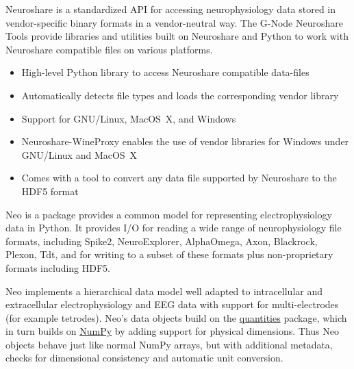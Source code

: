 \begin{multicols}{3}

Neuroshare is a standardized API for accessing neurophysiology
data stored in vendor-specific binary formats in a vendor-neutral
way. The G-Node Neuroshare Tools provide libraries and utilities
built on Neuroshare and Python to work with Neuroshare compatible
files on various platforms.

\begin{itemize}[nolistsep,topsep=0em,leftmargin=1pc]
\item High-level Python library to access Neuroshare compatible data-files
\item Automatically detects file types and loads the corresponding vendor library
\item Support for GNU/Linux, MacOS~X, and Windows
\item Neuroshare-WineProxy enables the use of vendor libraries for Windows under GNU/Linux and MacOS~X
\item Comes with a tool to convert any data file supported by Neuroshare to the HDF5 format
\end{itemize}

\vspace{1em}

Neo is a package provides a common model for representing
electrophysiology data in Python. It provides I/O for reading a wide
range of neurophysiology file formats, including Spike2,
NeuroExplorer, AlphaOmega, Axon, Blackrock, Plexon, Tdt, and for
writing to a subset of these formats plus non-proprietary formats
including HDF5.


Neo implements a hierarchical data model well adapted to intracellular
and extracellular electrophysiology and EEG data with support for
multi-electrodes (for example tetrodes).  Neo's data objects build on
the \href{http://pypi.python.org/pypi/quantities}{quantities} package,
which in turn builds on \href{http://www.numpy.org}{NumPy} by adding
support for physical dimensions. Thus Neo objects behave just like
normal NumPy arrays, but with additional metadata, checks for
dimensional consistency and automatic unit conversion.


\end{multicols}
